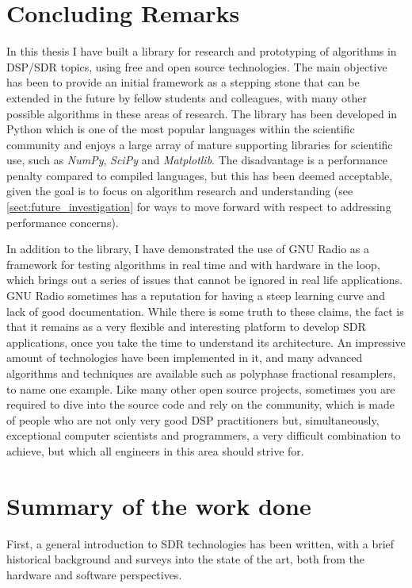 \section{Concluding Remarks}
\label{sect:concluding_remarks}

In this thesis I have built a library for research and prototyping of algorithms in DSP/SDR topics, using free and open source technologies. The main objective has been to provide an initial framework as a stepping stone that can be extended in the future by fellow students and colleagues, with many other possible algorithms in these areas of research. The library has been developed in Python which is one of the most popular languages within the scientific community and enjoys a large array of mature supporting libraries for scientific use, such as \emph{NumPy}, \emph{SciPy} and \emph{Matplotlib}. The disadvantage is a performance penalty compared to compiled languages, but this has been deemed acceptable, given the goal is to focus on algorithm research and understanding (see \autoref{sect:future_investigation} for ways to move forward with respect to addressing performance concerns).

In addition to the library, I have demonstrated the use of GNU Radio as a framework for testing algorithms in real time and with hardware in the loop, which brings out a series of issues that cannot be ignored in real life applications. GNU Radio sometimes has a reputation for having a steep learning curve and lack of good documentation. While there is some truth to these claims, the fact is that it remains as a very flexible and interesting platform to develop SDR applications, once you take the time to understand its architecture. An impressive amount of technologies have been implemented in it, and many advanced algorithms and techniques are available such as polyphase fractional resamplers, to name one example. Like many other open source projects, sometimes you are required to dive into the source code and rely on the community, which is made of people who are not only very good DSP practitioners but, simultaneously, exceptional computer scientists and programmers, a very difficult combination to achieve, but which all engineers in this area should strive for.

\section{Summary of the work done}
\label{sect:summary_of_the_work_done}

First, a general introduction to SDR technologies has been written, with a brief historical background and surveys into the state of the art, both from the hardware and software perspectives.

